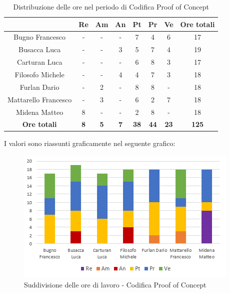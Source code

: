    \begin{table}[H]
       \centering
       \renewcommand{\arraystretch}{1.8}
       \begin{tabular}{c|c|c|c|c|c|c|c}
         \rowcolor[HTML]{125E28} 
         \multicolumn{1}{c}{\color[HTML]{FFFFFF}\textbf{ Nominativo }}
         & \multicolumn{1}{c}{\color[HTML]{FFFFFF}\textbf{ Re }}
         & \multicolumn{1}{c}{\color[HTML]{FFFFFF}\textbf{ Am}}
         & \multicolumn{1}{c}{\color[HTML]{FFFFFF}\textbf{ An }}
         & \multicolumn{1}{c}{\color[HTML]{FFFFFF}\textbf{ Pt }}
         & \multicolumn{1}{c}{\color[HTML]{FFFFFF}\textbf{ Pr }}
         & \multicolumn{1}{c}{\color[HTML]{FFFFFF}\textbf{ Ve }}
         & \multicolumn{1}{c}{\color[HTML]{FFFFFF}\textbf{ Ore totali }}\\
         \hline
         Bugno Francesco        & - & - & - & 7 & 4 & 6 & 17\\
         Busacca Luca           & - & - & 3 & 5 & 7 & 4 & 19\\
         Carturan Luca          & - & - & - & 6 & 8 & 3 & 17\\
         Filosofo Michele       & - & - & 4 & 4 & 7 & 3 & 18\\
         Furlan Dario           & - & 2 & - & 8 & 8 & - & 18\\
         Mattarello Francesco   & - & 3 & - & 6 & 2 & 7 & 18\\
         Midena Matteo          & 8 & - & - & 2 & 8 & - & 18\\
         \textbf{Ore totali} & \textbf{8} & \textbf{5} & \textbf{7} & \textbf{38} & \textbf{44} & \textbf{23} & \textbf{125}
       \end{tabular}
       \caption{Distribuzione delle ore nel periodo di Codifica Proof of Concept}
     \end{table}
   
   I valori sono riassunti graficamente nel seguente grafico:
   
   \begin{figure}[H]
       \centering
        \includegraphics[scale=1.2]{immagini/ore_lavoro_PoC.png}
        \caption{Suddivisione delle ore di lavoro - Codifica Proof of Concept}
      \end{figure}
   
